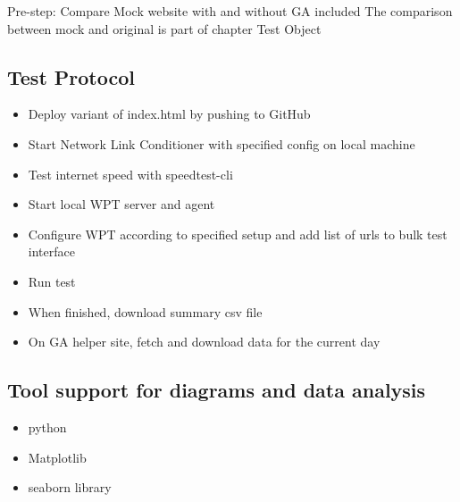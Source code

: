 Pre-step: Compare Mock website with and without GA included
The comparison between mock and original is part of chapter Test Object




\subsection{Test Protocol}

\begin{itemize}
\item Deploy variant of index.html by pushing to GitHub
\item Start Network Link Conditioner with specified config on local machine
\item Test internet speed with speedtest-cli
\item Start local WPT server and agent
\item Configure WPT according to specified setup and add list of urls to bulk test interface
\item Run test
\item When finished, download summary csv file
\item On GA helper site, fetch and download data for the current day
\end{itemize}








\subsection{Tool support for diagrams and data analysis}

\begin{itemize}
\item python
\item Matplotlib
\item seaborn library
\end{itemize}
